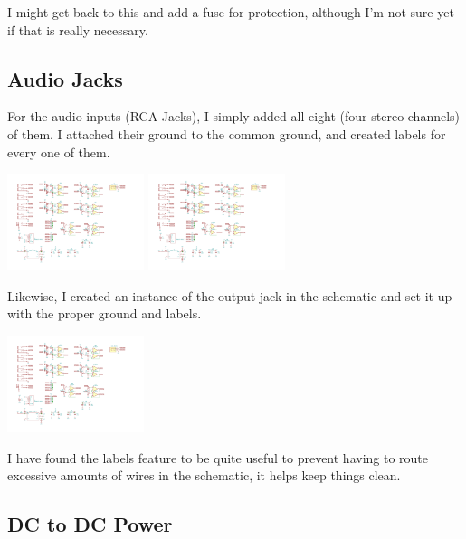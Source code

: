 \documentclass[a4paper]{article}
\begin{document}
I might get back to this and add a fuse for protection, although I'm not sure yet if that is really necessary.

\subsection{Audio Jacks}

For the audio inputs (RCA Jacks), I simply added all eight (four stereo channels) of them. I attached their ground to the common ground, and created labels for every one of them.

\begin{center}
  \includegraphics[trim={2cm 14.7cm 24cm 2cm},width=4cm,clip]{images/audio-mixer.pdf}
  \includegraphics[trim={2cm 10.5cm 24cm 6.2cm},width=4cm,clip]{images/audio-mixer.pdf}
\end{center}

Likewise, I created an instance of the output jack in the schematic and set it up with the proper ground and labels.

\begin{center}
  \includegraphics[trim={2cm 8.5cm 24cm 10.4cm},width=4cm,clip]{images/audio-mixer.pdf}
\end{center}

I have found the labels feature to be quite useful to prevent having to route excessive amounts of wires in the schematic, it helps keep things clean.

\subsection{DC to DC Power}
\end{document}
